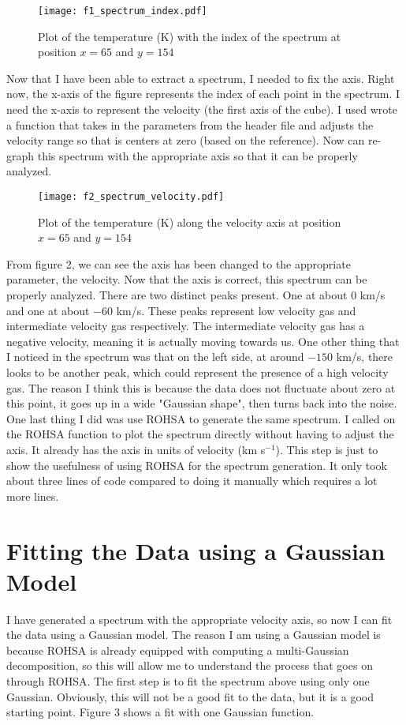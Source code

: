 \documentclass[12pt]{report}
\begin{document}
\begin{figure}[!htb]
\centering
\texttt{[image: f1\_spectrum\_index.pdf]}
\caption{Plot of the temperature (K) with the index of the spectrum at position $x = 65$ and $y = 154$}
\label{fig:f1}
\end{figure}

Now that I have been able to extract a spectrum, I needed to fix the axis. 
Right now, the x-axis of the figure represents the index of each point in the spectrum.
I need the x-axis to represent the velocity (the first axis of the cube). 
I used wrote a function that takes in the parameters from the header file and adjusts the velocity range so that is centers at zero (based on the reference).
Now can re-graph this spectrum with the appropriate axis so that it can be properly analyzed.

\begin{figure}[!htb]
\centering
\texttt{[image: f2\_spectrum\_velocity.pdf]}
\caption{Plot of the temperature (K) along the velocity axis at position $x = 65$ and $y = 154$}
\label{fig:f2}
\end{figure}

From figure 2, we can see the axis has been changed to the appropriate parameter, the velocity. 
Now that the axis is correct, this spectrum can be properly analyzed.
There are two distinct peaks present.
One at about $0$ km/s and one at about $-60$ km/s. 
These peaks represent low velocity gas and intermediate velocity gas respectively. 
The intermediate velocity gas has a negative velocity, meaning it is actually moving towards us. 
One other thing that I noticed in the spectrum was that on the left side, at around $-150$ km/s, there looks to be another peak, which could represent the presence of a high velocity gas.
The reason I think this is because the data does not fluctuate about zero at this point, it goes up in a wide "Gaussian shape", then turns back into the noise.
One last thing I did was use ROHSA to generate the same spectrum.
I called on the ROHSA function to plot the spectrum directly without having to adjust the axis.
It already has the axis in units of velocity (km s$^{-1}$). 
This step is just to show the usefulness of using ROHSA for the spectrum generation.
It only took about three lines of code compared to doing it manually which requires a lot more lines.


\section*{Fitting the Data using a Gaussian Model}
I have generated a spectrum with the appropriate velocity axis, so now I can fit the data using a Gaussian model. 
The reason I am using a Gaussian model is because ROHSA is already equipped with computing a multi-Gaussian decomposition, so this will allow me to understand the process that goes on through ROHSA. 
The first step is to fit the spectrum above using only one Gaussian. Obviously, this will not be a good fit to the data, but it is a good starting point. Figure 3 shows a fit with one Gaussian function.
\end{document}
